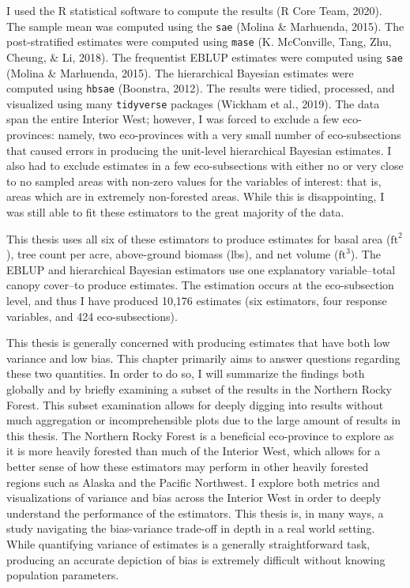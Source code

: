 \documentclass[12pt,twoside]{reedthesis}
\begin{document}
I used the R statistical software to compute the results (R Core Team, 2020). The sample mean was computed using the \texttt{sae} (Molina \& Marhuenda, 2015). The post-stratified estimates were computed using \texttt{mase} (K. McConville, Tang, Zhu, Cheung, \& Li, 2018). The frequentist EBLUP estimates were computed using \texttt{sae} (Molina \& Marhuenda, 2015). The hierarchical Bayesian estimates were computed using \texttt{hbsae} (Boonstra, 2012). The results were tidied, processed, and visualized using many \texttt{tidyverse} packages (Wickham et al., 2019). The data span the entire Interior West; however, I was forced to exclude a few eco-provinces: namely, two eco-provinces with a very small number of eco-subsections that caused errors in producing the unit-level hierarchical Bayesian estimates. I also had to exclude estimates in a few eco-subsections with either no or very close to no sampled areas with non-zero values for the variables of interest: that is, areas which are in extremely non-forested areas. While this is disappointing, I was still able to fit these estimators to the great majority of the data.

This thesis uses all six of these estimators to produce estimates for basal area (\(\text{ft}^2\)), tree count per acre, above-ground biomass (lbs), and net volume (\(\text{ft}^3\)). The EBLUP and hierarchical Bayesian estimators use one explanatory variable--total canopy cover--to produce estimates. The estimation occurs at the eco-subsection level, and thus I have produced 10,176 estimates (six estimators, four response variables, and 424 eco-subsections).

This thesis is generally concerned with producing estimates that have both low variance and low bias. This chapter primarily aims to answer questions regarding these two quantities. In order to do so, I will summarize the findings both globally and by briefly examining a subset of the results in the Northern Rocky Forest. This subset examination allows for deeply digging into results without much aggregation or incomprehensible plots due to the large amount of results in this thesis. The Northern Rocky Forest is a beneficial eco-province to explore as it is more heavily forested than much of the Interior West, which allows for a better sense of how these estimators may perform in other heavily forested regions such as Alaska and the Pacific Northwest. I explore both metrics and visualizations of variance and bias across the Interior West in order to deeply understand the performance of the estimators. This thesis is, in many ways, a study navigating the bias-variance trade-off in depth in a real world setting. While quantifying variance of estimates is a generally straightforward task, producing an accurate depiction of bias is extremely difficult without knowing population parameters.
\end{document}
